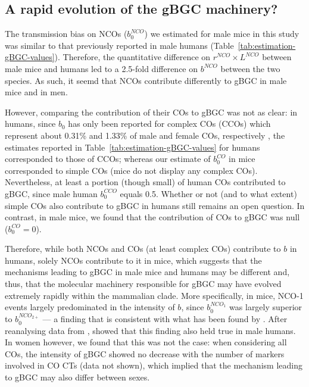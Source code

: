 \subsection{A rapid evolution of the gBGC machinery?}






The transmission bias on NCOs ($b_0^{NCO}$) we estimated for male mice in this study was similar to that previously reported in male humans (Table~\ref{tab:estimation-gBGC-values}).
Therefore, the quantitative difference on $r^{NCO} \times L^{NCO}$ between male mice and humans led to a 2.5-fold difference on $b^{NCO}$ between the two species. 
As such, it seemd that NCOs contribute differently to gBGC in male mice and in men.


However, comparing the contribution of their COs to gBGC was not as clear: 
in humans, since $b_0$ has only been reported for complex COs (CCOs) which represent about 0.31\% and 1.33\% of male and female COs, respectively \citep{webb2008sperm, halldorsson2016rate}, the estimates reported in Table~\ref{tab:estimation-gBGC-values} for humans corresponded to those of CCOs; whereas our estimate of $b_0^{CO}$ in mice corresponded to simple COs (mice do not display any complex COs).
Nevertheless, at least a portion (though small) of human COs contributed to gBGC, since male human $b_0^{CCO}$ equals 0.5. 
Whether or not (and to what extent) simple COs also contribute to gBGC in humans still remains an open question. 
In contrast, in male mice, we found that the contribution of COs to gBGC was null ($b_0^{CO} = 0$).

Therefore, while both NCOs and COs (at least complex COs) contribute to $b$ in humans, solely NCOs contribute to it in mice, which suggests that the mechanisms leading to gBGC in male mice and humans may be different and, thus, that the molecular machinery responsible for gBGC may have evolved extremely rapidly within the mammalian clade.
More specifically, in mice, NCO-1 events largely predominated in the intensity of $b$, since $b_0^{NCO_1}$ was largely superior to $b_0^{NCO_{2+}}$ — a finding that is consistent with what has been found by \citet{li2018highresolution}.
After reanalysing data from \citet{halldorsson2016rate}, \citet{li2018highresolution} showed that this finding also held true in male humans. 
In women however, we found that this was not the case: when considering all COs, the intensity of gBGC showed no decrease with the number of markers involved in CO CTs (data not shown), which implied that the mechanism leading to gBGC may also differ between sexes.




